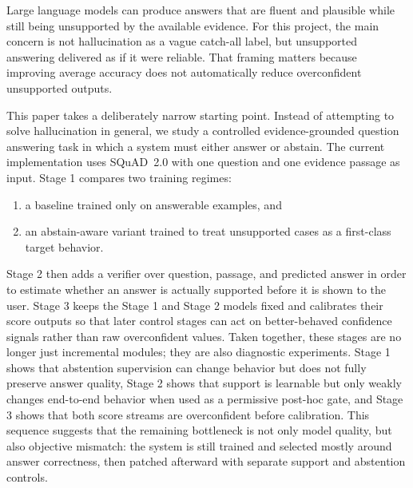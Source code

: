 Large language models can produce answers that are fluent and plausible while
still being unsupported by the available evidence.
For this project, the main concern is not hallucination as a vague catch-all
label, but unsupported answering delivered as if it were reliable.
That framing matters because improving average accuracy does not automatically
reduce overconfident unsupported outputs.

This paper takes a deliberately narrow starting point.
Instead of attempting to solve hallucination in general, we study a controlled
evidence-grounded question answering task in which a system must either answer
or abstain.
The current implementation uses SQuAD~2.0 \citep{rajpurkar2018know}
with one question and one evidence passage as input.
Stage 1 compares two training regimes:
\begin{enumerate}[leftmargin=1.25em]
  \item a baseline trained only on answerable examples, and
  \item an abstain-aware variant trained to treat unsupported cases as a
  first-class target behavior.
\end{enumerate}
Stage 2 then adds a verifier over question, passage, and predicted answer in
order to estimate whether an answer is actually supported before it is shown to
the user.
Stage 3 keeps the Stage 1 and Stage 2 models fixed and calibrates their score
outputs so that later control stages can act on better-behaved confidence
signals rather than raw overconfident values.
Taken together, these stages are no longer just incremental modules;
they are also diagnostic experiments.
Stage 1 shows that abstention supervision can change behavior but does not
fully preserve answer quality, Stage 2 shows that support is learnable but only
weakly changes end-to-end behavior when used as a permissive post-hoc gate,
and Stage 3 shows that both score streams are overconfident before
calibration.
This sequence suggests that the remaining bottleneck is not only model quality,
but also objective mismatch:
the system is still trained and selected mostly around answer correctness, then
patched afterward with separate support and abstention controls.

